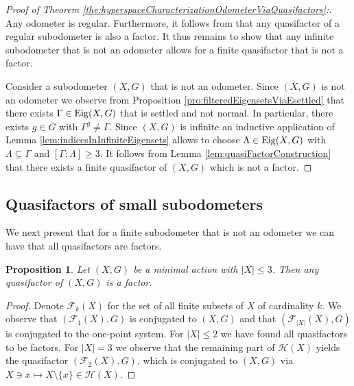 \documentclass[12pt, reqno]{amsart}
\newtheorem{proposition}[theorem]{Proposition}
\theoremstyle{definition}
\theoremstyle{remark}
\numberwithin{equation}{section}
\theoremstyle{theorem}
\theoremstyle{remark}
\def\Eig{{\rm Eig}}
\def\hyper{{\mathcal{H}}}
\begin{document}
\begin{proof}[Proof of Theorem \ref{the:hyperspaceCharacterizationOdometerViaQuasifactors}:]
    Any odometer is regular. 
    Furthermore, it follows from \cite[Corollary~11.21]{auslander1988minimal} that any quasifactor of a regular subodometer is also a factor. 
    It thus remains to show that any infinite subodometer that is not an odometer allows for a finite quasifactor that is not a factor.

    Consider a subodometer $(X,G)$ that is not an odometer. 
    Since $(X,G)$ is not an odometer we observe from Proposition \ref{pro:filteredEigensetsViaEsettled} that there exists $\Gamma\in \Eig(X,G)$ that is settled and not normal. 
    In particular, there exists $g\in G$ with $\Gamma^g\neq \Gamma$. 
    Since $(X,G)$ is infinite an inductive application of Lemma \ref{lem:indicesInInfiniteEigensets} allows to choose $\Lambda\in \Eig(X,G)$ with $\Lambda\subseteq \Gamma$ and $[\Gamma\colon \Lambda]\geq 3$. 
    It follows from Lemma \ref{lem:quasiFactorConstruction} that there exists a finite quasifactor of $(X,G)$ which is not a factor. 
\end{proof}



\subsection{Quasifactors of small subodometers}
\label{subsec:hyperspacesOfSubodometers_QuasifactorsOfSmallOdometers}
We next present that for a finite subodometer that is not an odometer we can have that all quasifactors are factors. 

\begin{proposition}
\label{pro:verySmallPhaseSpaces}
    Let $(X,G)$ be a minimal action with $|X|\leq 3$. Then any quasifactor of $(X,G)$ is a factor.         
\end{proposition}
\begin{proof}
    Denote $\mathcal{F}_k(X)$ for the set of all finite subsets of $X$ of cardinality $k$. We observe that $(\mathcal{F}_1(X),G)$ is conjugated to $(X,G)$ and that $(\mathcal{F}_{|X|}(X),G)$ is conjugated to the one-point system. 
    For $|X|\leq 2$ we have found all quasifactors to be factors. For $|X|=3$ we observe that the remaining part of $\hyper(X)$ yields the quasifactor $(\mathcal{F}_2(X),G)$, which is conjugated to $(X,G)$ via $X\ni x\mapsto X\setminus \{x\}\in \hyper(X)$. 
\end{proof}
\end{document}

